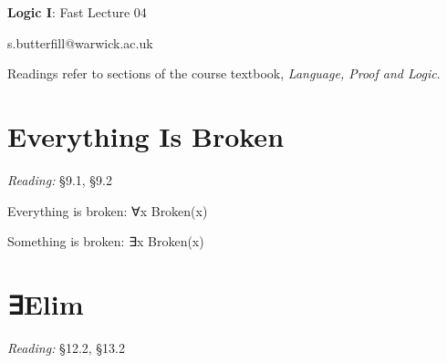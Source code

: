 \documentclass[12pt]{extarticle}
\date{}
\makeatletter
\def \ititle {Origins of Mind}
\def \isubtitle {Lecture 08}
\def \iemail{s.butterfill@warwick.ac.uk}
\makeatother
\begin{document}

\begin{multicols*}{3}

\setlength\footnotesep{1em}







\def \ititle {Logic I}
 
\def \isubtitle {Fast Lecture 04}
 
\begin{center}
 
{\Large
 
\textbf{\ititle}: \isubtitle
 
}
 
 
 
\iemail %
 
\end{center}
 
Readings refer to sections of the course textbook, \emph{Language, Proof and Logic}.
 
 
 
\section{Everything Is Broken}
 
\emph{Reading:} §9.1, §9.2
 
Everything is broken: ∀x Broken(x)
 
Something is broken: ∃x Broken(x)
 
 
 
\section{∃Elim}
 
\emph{Reading:} §12.2, §13.2
 

\end{multicols*}
\end{document}

